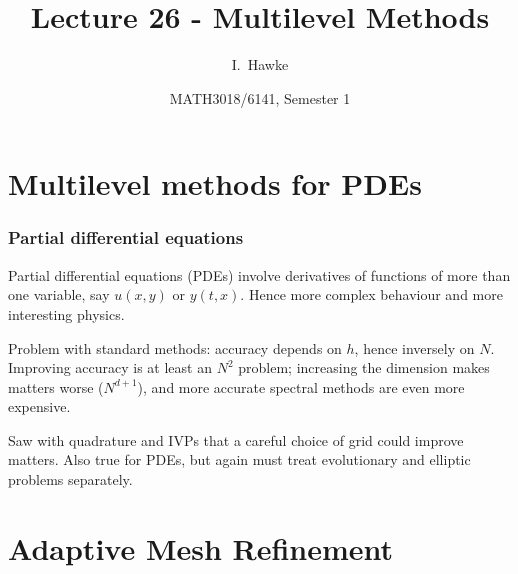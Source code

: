 \documentclass{beamer}
\title[Lecture 26] %
{Lecture 26 - Multilevel Methods}
\author[I. Hawke] %
{I.~Hawke}
\institute[University of Southampton] %
{
  School of Mathematics, \\
  University of Southampton, UK
}
\date[Semester 1] %
{MATH3018/6141, Semester 1}
\begin{document}
\begin{frame}
  \titlepage
\end{frame}

\section{Multilevel methods for PDEs}


\begin{frame}
  \frametitle{Partial differential equations}

  Partial differential equations (PDEs) involve derivatives of
  functions of more than one variable, say $u(x, y)$ or $y(t,
  x)$. Hence more complex behaviour and more interesting
  physics. \pause

  \vspace{1ex}

  Problem with standard methods: accuracy depends on $h$, hence
  inversely on $N$. \pause Improving accuracy is at least an $N^2$
  problem; increasing the dimension makes matters worse ($N^{d+1}$),
  and more accurate spectral methods are even more expensive. \pause

  \vspace{1ex}

  Saw with quadrature and IVPs that a careful choice of grid could
  improve matters. Also true for PDEs, but again must treat
  evolutionary and elliptic problems separately.

\end{frame}

\section{Adaptive Mesh Refinement}
\end{document}
